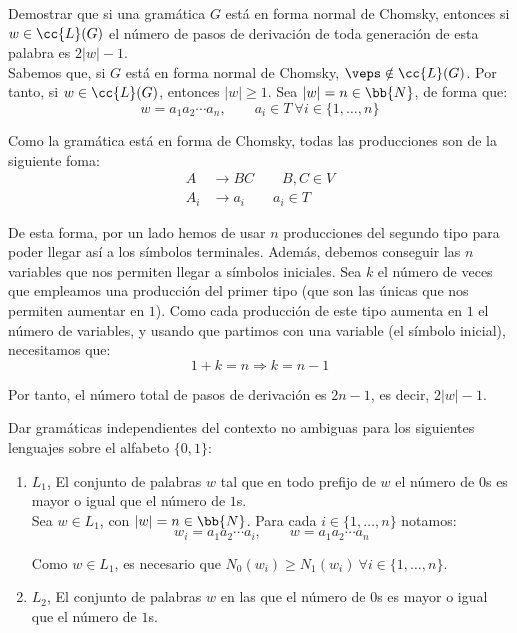 \begin{ejercicio}\label{ej:1.4.19}
    Demostrar que si una gramática $G$ está en forma normal de Chomsky, entonces si $w \in \cc{L}(G)$ el número de pasos de derivación de toda generación de esta palabra es $2|w| - 1$.\\

    Sabemos que, si $G$ está en forma normal de Chomsky, $\veps\notin \cc{L}(G)$. Por tanto, si $w\in \cc{L}(G)$, entonces $|w|\geq 1$. Sea $|w|=n\in \bb{N}$, de forma que:
    \begin{equation*}
        w=a_1a_2\cdots a_n,\qquad a_i\in T~\forall i\in\{1,\ldots,n\}
    \end{equation*}

    Como la gramática está en forma de Chomsky, todas las producciones son de la siguiente foma:
    \begin{align*}
        A & \to BC\qquad B,C \in V\\
        A_i &\to a_i\qquad a_i\in T
    \end{align*}

    De esta forma, por un lado hemos de usar $n$ producciones del segundo tipo para poder llegar así a los símbolos terminales. Además, debemos conseguir las $n$ variables que nos permiten llegar a símbolos iniciales. Sea $k$ el número de veces que empleamos una producción del primer tipo (que son las únicas que nos  permiten aumentar en $1$). Como cada producción de este tipo aumenta en $1$ el número de variables, y usando que partimos con una variable (el símbolo inicial), necesitamos que:
    \begin{equation*}
        1+k=n\Longrightarrow k=n-1
    \end{equation*}

    Por tanto, el número total de pasos de derivación es $2n-1$, es decir, $2|w|-1$.
\end{ejercicio}

\begin{ejercicio}\label{ej:1.4.20}
    Dar gramáticas independientes del contexto no ambiguas para los siguientes lenguajes sobre el alfabeto $\{ 0, 1 \}$:
    \begin{enumerate}
        \item $L_1$, El conjunto de palabras $w$ tal que en todo prefijo de $w$ el número de $0$s es mayor o igual que el número de $1$s.\\
        
        Sea $w\in L_1$, con $|w|=n\in \bb{N}$. Para cada $i\in \{1,\dots,n\}$ notamos:
        \begin{equation*}
            w_i=a_1a_2\cdots a_i,\qquad w=a_1a_2\cdots a_n
        \end{equation*}

        Como $w\in L_1$, es necesario que $N_0(w_i)\geq N_1(w_i)~\forall i\in \{1,\dots,n\}$.
        \item $L_2$, El conjunto de palabras $w$ en las que el número de $0$s es mayor o igual que el número de $1$s.
    \end{enumerate}
\end{ejercicio}

